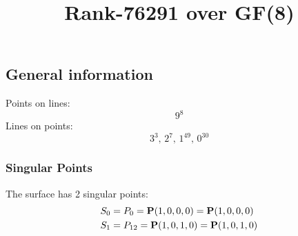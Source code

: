 \documentclass{article}
\newcommand\setTBstruts{\def\T{\rule{0pt}{2.6ex}}%
\def\B{\rule[-1.2ex]{0pt}{0pt}}}
\newcommand{\bP}{{\bf P}}
\begin{document}
 
\setTBstruts



{\allowdisplaybreaks%






\title{Rank-76291 over GF(8)}
\author{}%
\maketitle%
%
{}



\subsection*{General information}
Points on lines:
$$
9^8$$
Lines on points:
$$
3^3,\,2^7,\,1^{49},\,0^{30}$$
\subsubsection*{Singular Points}
The surface has 2 singular points:\\
\begin{align*}
S_{0} &= P_{0}=\bP(1, 0, 0, 0) = \bP(1, 0, 0, 0)\\
S_{1} &= P_{12}=\bP(1, 0, 1, 0) = \bP(1, 0, 1, 0)\\
\end{align*}
}
\end{document}
